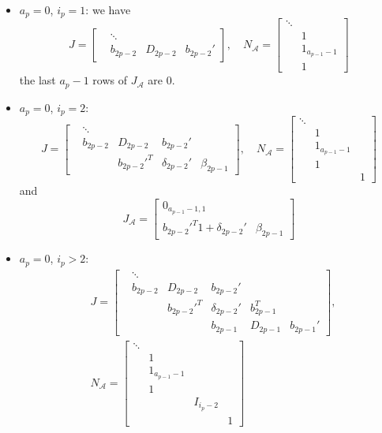 \documentclass[]{article}
\newcommand{\BIN}{\begin{bmatrix}}
\newcommand{\BOUT}{\end{bmatrix}}
\begin{document}
\begin{itemize}
	\item $a_p=0$, $i_p=1$: we have
  \begin{equation*}
    J = \BIN & \ddots & & \\
             & b_{2p-2} & D_{2p-2} & b_{2p-2}' \BOUT, \quad
    N_\mathcal{A} = \BIN \ddots & \\ & 1 \\ & 1_{a_{p-1}-1} \\ & 1 \BOUT
  \end{equation*}
  the last $a_p-1$ rows of $J_\mathcal{A}$ are $0$.
  \item $a_p = 0$, $i_p=2$:
  \begin{equation*}
    J = \BIN & \ddots   &             &                &              \\
             & b_{2p-2} & D_{2p-2}    & b_{2p-2}'      &              \\
             &          & b_{2p-2}'^T & \delta_{2p-2}' & \beta_{2p-1} \BOUT, \quad
    N_\mathcal{A} = \BIN \ddots & & \\ & 1 & \\ & 1_{a_{p-1}-1} & \\ & 1 & \\ & & 1 \BOUT
  \end{equation*}
  and
  \begin{equation*}
    J_\mathcal{A} = \BIN 0_{a_{p-1}-1,1} & \\ b_{2p-2}'^T 1 + \delta_{2p-2}' & \beta_{2p-1} \BOUT
  \end{equation*}
  \item $a_p = 0$, $i_p>2$:
  \begin{align*}
    &J = \BIN & \ddots   &             &                &            &           \\
             & b_{2p-2} & D_{2p-2}    & b_{2p-2}'      &            &           \\
             &          & b_{2p-2}'^T & \delta_{2p-2}' & b_{2p-1}^T &           \\
             &          &             & b_{2p-1}       & D_{2p-1}   & b_{2p-1}' \BOUT,\\
    &N_\mathcal{A} = \BIN \ddots & & & \\ & 1 & & \\ & 1_{a_{p-1}-1} & & \\ & 1 & & \\ & & I_{i_p-2} & \\ & & & 1 \BOUT
  \end{align*}

\end{itemize}
\end{document}
